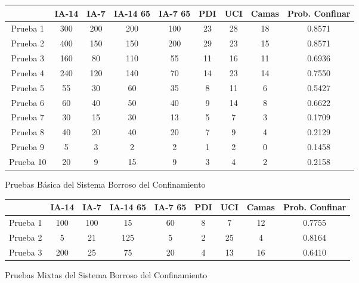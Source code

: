 \documentclass[12pt,a4paper, xcolor=table]{article}
\begin{document}
    \begin{figure}[!h]
      \centering
    \begin{tabular}{c|c|c|c|c|c|c|c|c|}
      \cline{2-9}
                                    & IA-14 & IA-7 & IA-14 65 & IA-7 65 & PDI & UCI & Camas & \textbf{Prob. Confinar} \\ \hline
    \multicolumn{1}{|c|}{Prueba 1} & 300 & 200 & 200 & 100 & 23 & 28 & 18 & 0.8571 \\ \hline
    \multicolumn{1}{|c|}{Prueba 2} & 400 & 150 & 150 & 200 & 29 & 23 & 15 & 0.8571 \\ \hline
    \multicolumn{1}{|c|}{Prueba 3} & 160 & 80 & 110 & 55 & 11 & 16 & 11 & 0.6936 \\ \hline
    \multicolumn{1}{|c|}{Prueba 4} & 240 & 120 & 140 & 70 & 14 & 23 & 14 & 0.7550 \\ \hline
    \multicolumn{1}{|c|}{Prueba 5} & 55 & 30 & 60 & 35 & 8 & 11 & 6 & 0.5427 \\ \hline
    \multicolumn{1}{|c|}{Prueba 6} & 60 & 40 & 50 & 40 & 9 & 14 & 8 & 0.6622 \\ \hline
    \multicolumn{1}{|c|}{Prueba 7} & 30 & 15 & 30 & 13 & 5 & 7 & 3 & 0.1709 \\ \hline
    \multicolumn{1}{|c|}{Prueba 8} & 40 & 20 & 40 & 20 & 7 & 9 & 4 & 0.2129 \\ \hline
    \multicolumn{1}{|c|}{Prueba 9} & 5 & 3 & 2 & 2 & 1 & 2 & 0 & 0.1458 \\ \hline
    \multicolumn{1}{|c|}{Prueba 10} & 20 & 9 & 15 & 9 & 3 & 4 & 2 & 0.2158 \\ \hline
    \end{tabular}
    \caption{Pruebas Básica del Sistema Borroso del Confinamiento}
  \end{figure}

    \vspace{2mm}

    \begin{figure}[!h]
      \centering
    \begin{tabular}{c|c|c|c|c|c|c|c|c|}
      \cline{2-9}
                                    & IA-14 & IA-7 & IA-14 65 & IA-7 65 & PDI & UCI & Camas & \textbf{Prob. Confinar} \\ \hline
    \multicolumn{1}{|c|}{Prueba 1} & 100 & 100 & 15 & 60 & 8 & 7 & 12 & 0.7755 \\ \hline
    \multicolumn{1}{|c|}{Prueba 2} & 5 & 21 & 125 & 5 & 2 & 25 & 4 & 0.8164 \\ \hline
    \multicolumn{1}{|c|}{Prueba 3} & 200 & 25 & 75 & 20 & 4 & 13 & 16 & 0.6410 \\ \hline
    \end{tabular}
    \caption{Pruebas Mixtas del Sistema Borroso del Confinamiento}
  \end{figure}
\end{document}
